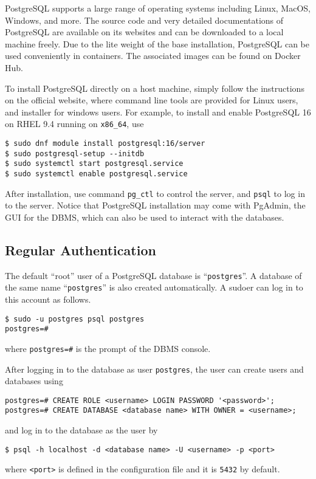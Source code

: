 PostgreSQL supports a large range of operating systems including Linux, MacOS, Windows, and more. The source code and very detailed documentations of PostgreSQL are available on its websites and can be downloaded to a local machine freely. Due to the lite weight of the base installation, PostgreSQL can be used conveniently in containers. The associated images can be found on Docker Hub.

To install PostgreSQL directly on a host machine, simply follow the instructions on the official website, where command line tools are provided for Linux users, and installer for windows users. For example, to install and enable PostgreSQL 16 on RHEL 9.4 running on \verb|x86_64|, use
\begin{lstlisting}
$ sudo dnf module install postgresql:16/server
$ sudo postgresql-setup --initdb
$ sudo systemctl start postgresql.service
$ sudo systemctl enable postgresql.service
\end{lstlisting}

After installation, use command \verb|pg_ctl| to control the server, and \verb|psql| to log in to the server. Notice that PostgreSQL installation may come with PgAdmin, the GUI for the DBMS, which can also be used to interact with the databases.

\subsection{Regular Authentication}

The default ``root'' user of a PostgreSQL database is ``\verb|postgres|''. A database of the same name ``\verb|postgres|'' is also created automatically. A sudoer can log in to this account as follows.
\begin{lstlisting}
$ sudo -u postgres psql postgres
postgres=#
\end{lstlisting}
where \verb|postgres=#| is the prompt of the DBMS console.

After logging in to the database as user \verb|postgres|, the user can create users and databases using
\begin{lstlisting}
postgres=# CREATE ROLE <username> LOGIN PASSWORD '<password>';
postgres=# CREATE DATABASE <database name> WITH OWNER = <username>;
\end{lstlisting}
and log in to the database as the user by
\begin{lstlisting}
$ psql -h localhost -d <database name> -U <username> -p <port>
\end{lstlisting}
where \verb|<port>| is defined in the configuration file and it is \verb|5432| by default.

